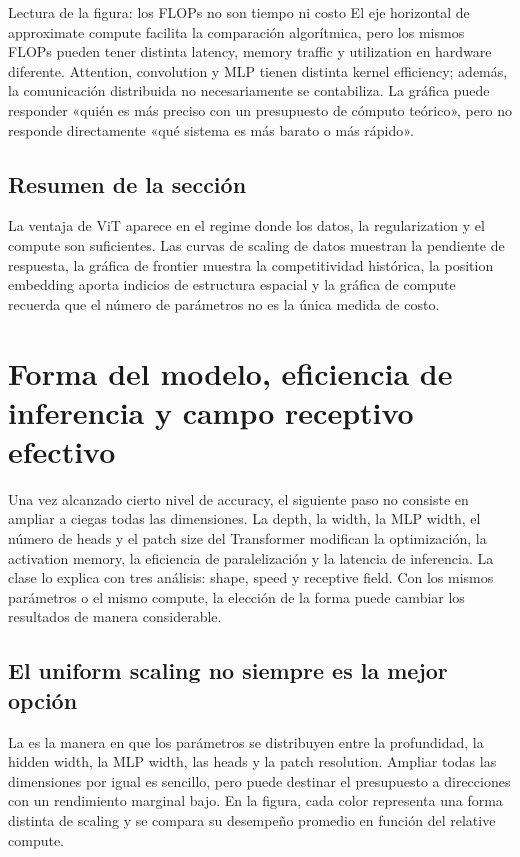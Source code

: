 \documentclass[a4paper]{article}
\begin{document}
\begin{knowledgebox}{Lectura de la figura: los FLOPs no son tiempo ni costo}
El eje horizontal de approximate compute facilita la comparación algorítmica, pero los mismos FLOPs pueden tener distinta latency, memory traffic y utilization en hardware diferente. Attention, convolution y MLP tienen distinta kernel efficiency; además, la comunicación distribuida no necesariamente se contabiliza. La gráfica puede responder «quién es más preciso con un presupuesto de cómputo teórico», pero no responde directamente «qué sistema es más barato o más rápido».
\end{knowledgebox}

\subsection{Resumen de la sección}

La ventaja de ViT aparece en el regime donde los datos, la regularization y el compute son suficientes. Las curvas de scaling de datos muestran la pendiente de respuesta, la gráfica de frontier muestra la competitividad histórica, la position embedding aporta indicios de estructura espacial y la gráfica de compute recuerda que el número de parámetros no es la única medida de costo.
\section{Forma del modelo, eficiencia de inferencia y campo receptivo efectivo}

Una vez alcanzado cierto nivel de accuracy, el siguiente paso no consiste en ampliar a ciegas todas las dimensiones. La depth, la width, la MLP width, el número de heads y el patch size del Transformer modifican la optimización, la activation memory, la eficiencia de paralelización y la latencia de inferencia. La clase lo explica con tres análisis: shape, speed y receptive field. Con los mismos parámetros o el mismo compute, la elección de la forma puede cambiar los resultados de manera considerable.

\subsection{El uniform scaling no siempre es la mejor opción}

La  es la manera en que los parámetros se distribuyen entre la profundidad, la hidden width, la MLP width, las heads y la patch resolution. Ampliar todas las dimensiones por igual es sencillo, pero puede destinar el presupuesto a direcciones con un rendimiento marginal bajo. En la figura, cada color representa una forma distinta de scaling y se compara su desempeño promedio en función del relative compute.
\end{document}
